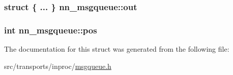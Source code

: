 \subsubsection[{out}]{\setlength{\rightskip}{0pt plus 5cm}struct \{ ... \}   nn\+\_\+msgqueue\+::out}\hypertarget{structnn__msgqueue_a752f1190a9edc8818dbb980ce7b849f3}{}\label{structnn__msgqueue_a752f1190a9edc8818dbb980ce7b849f3}
\subsubsection[{pos}]{\setlength{\rightskip}{0pt plus 5cm}int nn\+\_\+msgqueue\+::pos}\hypertarget{structnn__msgqueue_a3714414d2aad4d30b34bc8c3bd865003}{}\label{structnn__msgqueue_a3714414d2aad4d30b34bc8c3bd865003}


The documentation for this struct was generated from the following file\+:\begin{DoxyCompactItemize}
\item 
src/transports/inproc/\hyperlink{msgqueue_8h}{msgqueue.\+h}\end{DoxyCompactItemize}
